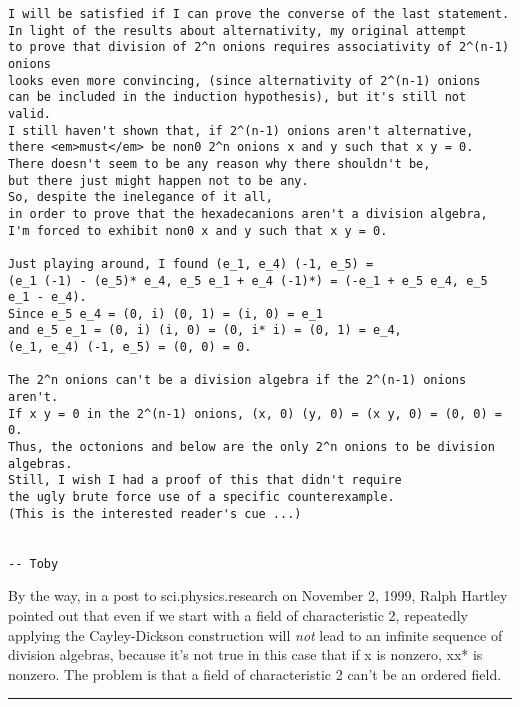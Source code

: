 \begin{verbatim}
I will be satisfied if I can prove the converse of the last statement.
In light of the results about alternativity, my original attempt
to prove that division of 2^n onions requires associativity of 2^(n-1) onions
looks even more convincing, (since alternativity of 2^(n-1) onions
can be included in the induction hypothesis), but it's still not valid.
I still haven't shown that, if 2^(n-1) onions aren't alternative,
there <em>must</em> be non0 2^n onions x and y such that x y = 0.
There doesn't seem to be any reason why there shouldn't be,
but there just might happen not to be any.
So, despite the inelegance of it all,
in order to prove that the hexadecanions aren't a division algebra,
I'm forced to exhibit non0 x and y such that x y = 0.

Just playing around, I found (e_1, e_4) (-1, e_5) =
(e_1 (-1) - (e_5)* e_4, e_5 e_1 + e_4 (-1)*) = (-e_1 + e_5 e_4, e_5 e_1 - e_4).
Since e_5 e_4 = (0, i) (0, 1) = (i, 0) = e_1
and e_5 e_1 = (0, i) (i, 0) = (0, i* i) = (0, 1) = e_4,
(e_1, e_4) (-1, e_5) = (0, 0) = 0.

The 2^n onions can't be a division algebra if the 2^(n-1) onions aren't.
If x y = 0 in the 2^(n-1) onions, (x, 0) (y, 0) = (x y, 0) = (0, 0) = 0.
Thus, the octonions and below are the only 2^n onions to be division algebras.
Still, I wish I had a proof of this that didn't require
the ugly brute force use of a specific counterexample.
(This is the interested reader's cue ...)


-- Toby
\end{verbatim}
    

By the way, in a post to sci.physics.research on November 2, 1999, 
Ralph Hartley pointed out 
that even if we start with a field of characteristic 2, repeatedly
applying the Cayley-Dickson construction will \emph{not} lead to an
infinite sequence of division algebras, because it's not true
in this case that if x is nonzero, xx* is nonzero.  The problem is
that a field of characteristic 2 can't be an ordered field.



\par\noindent\rule{\textwidth}{0.4pt}


